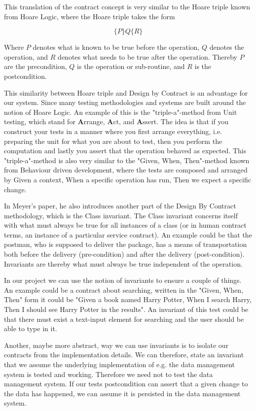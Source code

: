 This translation of the contract concept is very similar to the Hoare triple known from Hoare Logic, where the Hoare triple takes the form

\begin{equation}
\{P\} Q \{R\}
\end{equation}

Where $P$ denotes what is known to be true before the operation, $Q$ denotes the operation, and $R$ denotes what needs to be true after the operation. Thereby $P$ are the precondition, $Q$ is the operation or sub-routine, and $R$ is the postcondition. 

This similarity between Hoare triple and Design by Contract is an advantage for our system. Since many testing methodologies and systems are built around the notion of Hoare Logic. 
An example of this is the "triple-a"-method from Unit testing, which stand for \textbf{A}rrange, \textbf{A}ct, and \textbf{A}ssert.
The idea is that if you construct your tests in a manner where you first arrange everything, i.e. preparing the unit for what you are about to test, then you perform the computation and lastly you assert that the operation behaved as expected. 
This "triple-a"-method is also very similar to the "Given, When, Then"-method known from Behaviour driven development, where the tests are composed and arranged by Given a context, When a specific operation has run, Then we expect a specific change. 

In Meyer's paper, he also introduces another part of the Design By Contract methodology, which is the Class invariant. The Class invariant concerns itself with what must always be true for all instances of a class (or in human contract terms, an instance of a particular service contract). An example could be that the postman, who is supposed to deliver the package, has a means of transportation both before the delivery (pre-condition) and after the delivery (post-condition). Invariants are thereby what must always be true independent of the operation.

In our project we can use the notion of invariants to ensure a couple of things. 
An example could be a contract about searching, written in the "Given, When, Then" form it could be "Given a book named Harry Potter, When I search Harry, Then I should see Harry Potter in the results".
An invariant of this test could be that there must exist a text-input element for searching and the user should be able to type in it.

Another, maybe more abstract, way we can use invariants is to isolate our contracts from the implementation details.
We can therefore, state an invariant that we assume the underlying implementation of e.g. the data management system is tested and working. 
Therefore we need not to test the data management system. If our tests postcondition can assert that a given change to the data has happened, we can assume it is persisted in the data management system.

